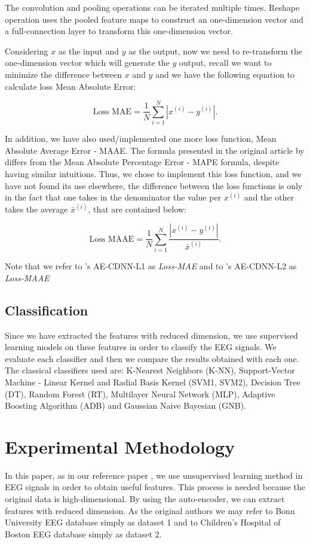 The convolution and pooling operations can be iterated multiple times. Reshape operation uses the pooled feature maps to construct an one-dimension vector and a full-connection layer to transform this one-dimension vector. 

Considering $x$ as the input and $y$ as the output, now we need to re-transform the one-dimension vector which will generate the $y$ output, recall we want to minimize the difference between $x$ and $y$ and we have the following equation to calculate loss Mean Absolute Error:

$$\text{Loss MAE}= \frac{1}{N} \sum_{i=1}^N |x^{(i)} - y^{(i)}| .$$


In addition, we have also used/implemented one more loss function, Mean Absolute Average Error - MAAE. The formula presented in the original article by \cite{WenZha:2018} differs from the Mean Absolute Percentage Error - MAPE formula, despite having similar intuitions. Thus, we chose to implement this loss function, and we have not found its use elsewhere, the difference between the loss functions is only in the fact that one takes in the denominator the value per $x^{(i)}$ and the other takes the average ${\bar x^{(i)}}$, that are contained below:

$$\text{Loss MAAE}= \frac{1}{N} \sum_{i=1}^N \frac{|x^{(i)} - y^{(i)}|}{{\bar x^{(i)}}} .$$

Note that we refer to \cite{WenZha:2018}'s AE-CDNN-L1 as {\it Loss-MAE} and to \cite{WenZha:2018}'s AE-CDNN-L2 as {\it Loss-MAAE}

\subsection{Classification}

Since we have extracted the features with reduced dimension, we use supervised learning models on these features in order to classify the EEG signals. We evaluate each classifier and then we compare the results obtained with each one. The classical classifiers used are: K-Nearest Neighbors (K-NN), Support-Vector Machine - Linear Kernel and Radial Basis Kernel (SVM1, SVM2), Decision Tree (DT), Random Forest (RT), Multilayer Neural Network (MLP), Adaptive Boosting Algorithm (ADB) and Gaussian Naive Bayesian (GNB).
 
\section{Experimental Methodology}
\label{sec:metho}
In this paper, as in our reference paper \cite{WenZha:2018}, we use unsupervised learning method in EEG signals in order to obtain useful features. This process is needed because the original data is high-dimensional. By using the auto-encoder, we can extract features with reduced dimension. As the original authors we may refer to Bonn University EEG database simply as dataset 1 and to Children's Hospital of Boston EEG database simply as dataset 2.

